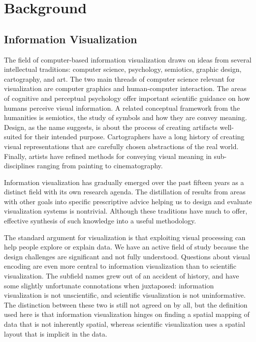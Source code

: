 \section{Background}
\label{sec:background}


\subsection{Information Visualization}
\label{sec:infovis}

The field of computer-based information visualization draws on ideas from several intellectual traditions: computer science, psychology, semiotics, graphic design, cartography, and art.
The two main threads of computer science relevant for visualization are computer graphics and human-computer interaction.
The areas of cognitive and perceptual psychology offer important scientific guidance on how humans perceive visual information.
A related conceptual framework from the humanities is semiotics, the study of symbols and how they are convey meaning.
Design, as the name suggests, is about the process of creating artifacts well- suited for their intended purpose.
Cartographers have a long history of creating visual representations that are carefully chosen abstractions of the real world.
Finally, artists have refined methods for conveying visual meaning in sub-disciplines ranging from painting to cinematography.

Information visualization has gradually emerged over the past fifteen years as a distinct field with its own research agenda.
The distillation of results from areas with other goals into specific prescriptive advice helping us to design and evaluate visualization systems is nontrivial.
Although these traditions have much to offer, effective synthesis of such knowledge into a useful methodology.

The standard argument for visualization is that exploiting visual processing can help people explore or explain data. We have an active field of study because the design challenges are significant and not fully understood. Questions about visual encoding are even more central to information visualization than to scientific visualization.
The subfield names grew out of an accident of history, and have some slightly unfortunate connotations when juxtaposed:
information visualization is not unscientific, and scientific visualization is not uninformative.
The distinction between these two is still not agreed on by all, but the definition used here is that information visualization hinges on finding a spatial mapping of data that is not inherently spatial,
whereas scientific visualization uses a spatial layout that is implicit in the data.

